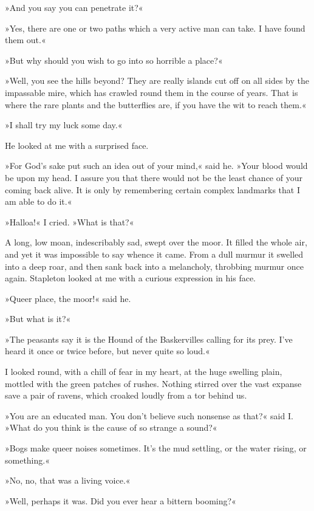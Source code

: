 »And you say you can penetrate it?«

»Yes, there are one or two paths which a very active man can take. I have found them out.«



»But why should you wish to go into so horrible a place?«

»Well, you see the hills beyond? They are really islands cut off on all sides by the impassable mire, which has crawled round them in the course of years. That is where the rare plants and the butterflies are, if you have the wit to reach them.«

»I shall try my luck some day.«

He looked at me with a surprised face.

»For God's sake put such an idea out of your mind,« said he. »Your blood would be upon my head. I assure you that there would not be the least chance of your coming back alive. It is only by remembering certain complex landmarks that I am able to do it.«

»Halloa!« I cried. »What is that?«

A long, low moan, indescribably sad, swept over the moor. It filled the whole air, and yet it was impossible to say whence it came. From a dull murmur it swelled into a deep roar, and then sank back into a melancholy, throbbing murmur once again. Stapleton looked at me with a curious expression in his face.

»Queer place, the moor!« said he.

»But what is it?«

»The peasants say it is the Hound of the Baskervilles calling for its prey. I've heard it once or twice before, but never quite so loud.«

I looked round, with a chill of fear in my heart, at the huge swelling plain, mottled with the green patches of rushes. Nothing stirred over the vast expanse save a pair of ravens, which croaked loudly from a tor behind us.

»You are an educated man. You don't believe such nonsense as that?« said I. »What do you think is the cause of so strange a sound?«

»Bogs make queer noises sometimes. It's the mud settling, or the water rising, or something.«

»No, no, that was a living voice.«

»Well, perhaps it was. Did you ever hear a bittern booming?«

